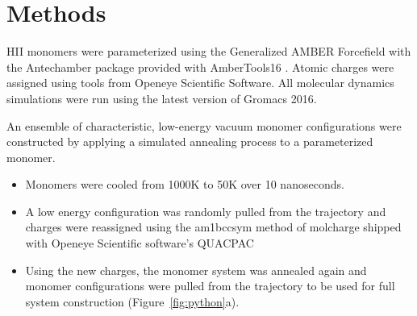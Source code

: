 \documentclass{article}
\begin{document}
  \section*{Methods}
  
  HII monomers were parameterized using the Generalized AMBER Forcefield
  \cite{wang_development_2004} with the Antechamber package \cite{wang_automatic_2006}
  provided with AmberTools16 \cite{case_ambertools16_2016}. Atomic charges were
  assigned using tools from Openeye Scientific Software. All molecular dynamics 
  simulations were run using the latest version of Gromacs 2016. 
  \cite{bekker_gromacs:_1993,berendsen_gromacs:_1995,van_der_spoel_gromacs:_2005,hess_gromacs_2008}
  
  An ensemble of characteristic, low-energy vacuum monomer configurations
  were constructed by applying a simulated annealing process to a
  parameterized monomer.
  \begin{itemize}
    \item Monomers were cooled from 1000K to 50K over 10 nanoseconds.
    \item A low energy configuration was randomly pulled from the trajectory
    and charges were reassigned using the am1bccsym method of molcharge
    shipped with Openeye Scientific software's QUACPAC %
    \item Using the new charges, the monomer system was annealed again and monomer
    configurations were pulled from the trajectory to be used for full
    system construction (Figure~\ref{fig:python}a).
  \end{itemize}
  
\end{document}
